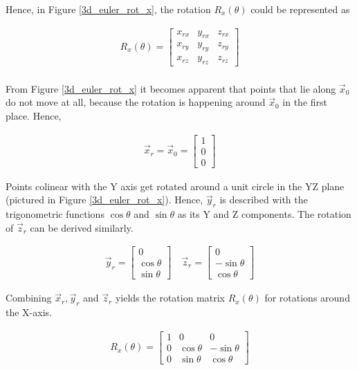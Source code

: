 \documentclass[12pt, a4paper]{article}
\begin{document}
Hence, in Figure \ref{3d_euler_rot_x}, the rotation $R_x(\theta)$ could be represented
as

\begin{align*}
    R_x(\theta) = \begin{bmatrix}
        {x}_{rx} & {y}_{rx} & {z}_{rx} \\
        {x}_{ry} & {y}_{ry} & {z}_{ry} \\
        {x}_{rz} & {y}_{rz} & {z}_{rz}
    \end{bmatrix}
\end{align*}\\

From Figure \ref{3d_euler_rot_x} it becomes apparent that points that lie along
$\vec{x}_0$ do not move at all, because the rotation is happening around
$\vec{x}_0$ in the first place. Hence,

\begin{align*}
    \vec{x}_r = \vec{x}_0 = \begin{bmatrix} 1 \\
                              0 \\ 0\end{bmatrix}
\end{align*}

Points colinear with the Y axis get rotated around a unit circle in the YZ plane
(pictured in Figure \ref{3d_euler_rot_x}). Hence, $\vec{y}_r$ is described with
the trigonometric functions $\cos \theta$ and $\sin \theta$ as its Y and Z
components. The rotation of $\vec{z}_r$ can be derived similarly.

\begin{align*}
    \vec{y}_r = \begin{bmatrix} 0 \\ \cos\theta \\ \sin\theta
                      \end{bmatrix}
    \quad
    \vec{z}_r
    = \begin{bmatrix}
          0           \\
          -\sin\theta \\
          \cos\theta
      \end{bmatrix}
\end{align*}

Combining $\vec{x}_r, \vec{y}_r$ and $\vec{z}_r$ yields the rotation matrix
$R_x(\theta)$ for rotations around the X-axis.

\begin{align*}
    R_x(\theta)
    = \begin{bmatrix}
          1 & 0          & 0           \\
          0 & \cos\theta & -\sin\theta \\
          0 & \sin\theta & \cos\theta
      \end{bmatrix}
\end{align*}
\end{document}
